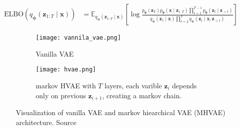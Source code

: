 \begin{align}
    \mathrm{ELBO}(q_{\boldsymbol{\phi}}(\boldsymbol{z}_{1:T}\mid\boldsymbol{x}))  &=
    \mathbb{E}_{q_{\boldsymbol{\phi}}(\boldsymbol{z}_{1:T}\mid\boldsymbol{x})}\left[\log \frac{p_{\boldsymbol{\theta}}(\boldsymbol{z}_T)p_{\boldsymbol{\theta}}(\boldsymbol{x}\mid\boldsymbol{z}_{1:T})\prod_{t=1}^{T-1}p_{\boldsymbol{\theta}}(\boldsymbol{z}_{t}\mid\boldsymbol{z}_{>t})}{q_{\boldsymbol{\phi}}(\boldsymbol{z}_1\mid\boldsymbol{x})\prod_{t=2}^{T}q_{\boldsymbol{\phi}}(\boldsymbol{z}_{t}\mid\boldsymbol{x},\boldsymbol{z}_{<t})}\right]
\end{align}

\begin{figure}[]
    \centering
    \begin{subfigure}[b]{0.27\textwidth}
        \centering
        \texttt{[image: vannila\_vae.png]}
        \caption[]{Vanilla VAE}
        \label{fig:vanilla-vae}
    \end{subfigure}
    \hfill
    \begin{subfigure}[b]{0.63\textwidth}
        \centering
        \texttt{[image: hvae.png]}
        \caption[]{markov HVAE with $T$ layers, each varible $\boldsymbol{z}_i$ depends only on previous $\boldsymbol{z}_{i+1}$, creating a markov chain.}
        \label{fig:mhvae}
    \end{subfigure}
    \caption[VAE vs HVAE architecture]{Visualization of vanilla VAE and markov hiearchical VAE (MHVAE) architecture. Source~\cite{diffusion-models-blog-2018}}
    \label{fig:vae-architecture}
\end{figure}


